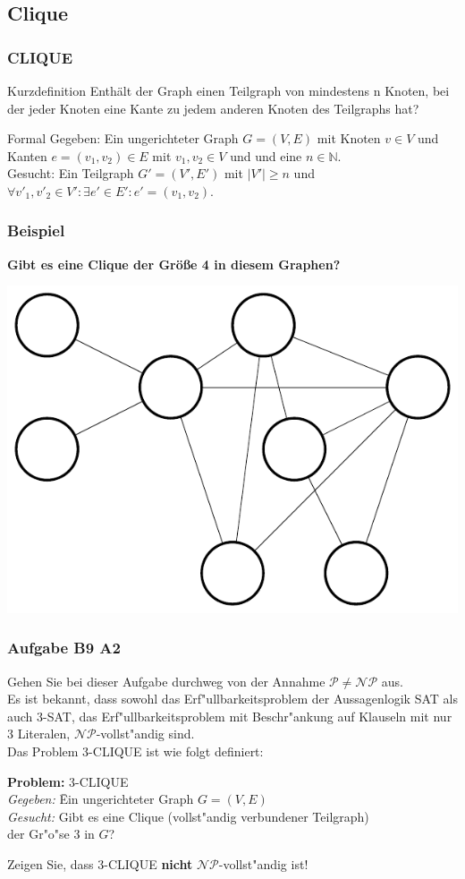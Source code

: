 \subsection{Clique}
\begin{frame}
	\frametitle{CLIQUE}
	\begin{block}{Kurzdefinition}
	Enthält der Graph einen Teilgraph von mindestens n Knoten, bei der jeder Knoten eine Kante zu jedem anderen Knoten des Teilgraphs hat?
	\end{block}
	\begin{block}{Formal}
	Gegeben: Ein ungerichteter Graph $G = (V,E)$ mit Knoten $v \in V$ und Kanten $e=(v_1, v_2)\in E$ mit $v_1, v_2 \in V$ und und eine $n \in \mathbb{N}$.\\
	Gesucht: Ein Teilgraph $G' = (V',E')$ mit $|V'|\ge n$ und $\forall v'_1, v'_2\in V':\exists e'\in E': e'=(v_1,v_2)$.
	\end{block}
\end{frame}
\begin{frame}
	\frametitle{Beispiel}
	\textbf{Gibt es eine Clique der Größe 4 in diesem Graphen?}
	\begin{center}
	\includegraphics[scale=0.6]{images/4CLIQUE}	
	\end{center}
\end{frame}

\begin{frame}
	\frametitle{Aufgabe B9 A2}
	Gehen Sie bei dieser Aufgabe durchweg von der Annahme $\mathcal{P} \neq \mathcal{NP}$
	aus.~\\
	Es ist bekannt, dass sowohl das Erf"ullbarkeitsproblem der Aussagenlogik SAT als
	auch 3-SAT, das	Erf"ullbarkeitsproblem mit Beschr"ankung auf Klauseln mit nur 3
	Literalen, $\mathcal{NP}$-vollst"andig sind.\\
	Das Problem 3-CLIQUE ist wie folgt definiert:
	\begin{tabbing}
	\textbf{Problem:} 3-CLIQUE\\
	\textit{Gegeben:} \= Ein ungerichteter Graph $G = (V,E)$\\
	\textit{Gesucht:} \> Gibt es eine Clique (vollst"andig verbundener Teilgraph)\\
	\> der Gr"o"se $3$ in $G$?
	\end{tabbing}
	Zeigen Sie, dass 3-CLIQUE \textbf{nicht} $\mathcal{NP}$-vollst"andig ist!
\end{frame}

